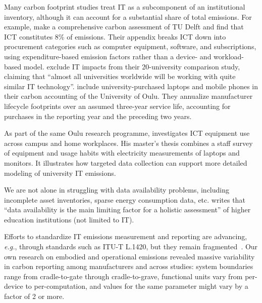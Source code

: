 \documentclass[11pt]{article}
\let\cite\parencite
\newcommand{\eg}{{\em e.g.}}
\begin{document}
Many carbon footprint studies treat IT as a subcomponent of an institutional
inventory, although it can account for a substantial share of total emissions.
For example, \textcite{herth:quantifying:2022} make a comprehensive carbon
assessment of TU Delft and find that ICT constitutes 8\% of emissions. Their
appendix breaks ICT down into procurement categories such as computer equipment,
software, and subscriptions, using expenditure-based emission factors rather
than a device- and workload-based model.
\textcite{helmers:universities:2021} exclude IT impacts from their 20-university
comparison study, claiming that ``almost all universities worldwide will be
working with quite similar IT technology''. \textcite{kiehle:2023} include
university-purchased laptops and mobile phones in their carbon accounting of
the University of Oulu. They annualize manufacturer lifecycle footprints over
an assumed three-year service life, accounting for purchases in the reporting
year and the preceding two years.

As part of the same Oulu research programme, \textcite{javid:2022} investigates
ICT equipment use across campus and home workplaces. His master's thesis
combines a staff survey of equipment and usage habits with electricity
measurements of laptops and monitors. It illustrates how targeted data collection
can support more detailed modeling of university IT emissions.

We are not alone in struggling with data availability problems, including
incomplete asset inventories, sparse energy consumption data, etc.
\textcite{jurgens:2023} writes that ``data availability is the main limiting
factor for a holistic assessment'' of higher education institutions (not limited
to IT).

Efforts to standardize IT emissions measurement and reporting are advancing,
\eg, through standards such as ITU-T L.1420, but they remain
fragmented~\cite{wb:itu:ict}. Our own research on embodied and operational
emissions revealed massive variability in carbon reporting among manufacturers
and across studies: system boundaries range from cradle-to-gate through
cradle-to-grave, functional units vary from per-device to per-computation, and
values for the same parameter might vary by a factor of 2 or more.
\end{document}
